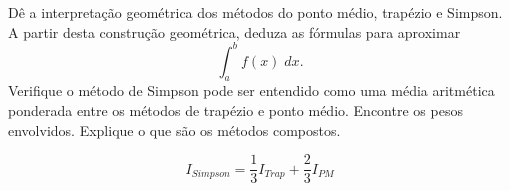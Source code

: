 %

\begin{exer}
 Dê a interpretação geométrica dos métodos do ponto médio, trapézio e Simpson. A partir desta construção geométrica, deduza as fórmulas para aproximar
 $$\int_a^bf(x)\;dx.$$
 Verifique o método de Simpson pode ser entendido como uma média aritmética ponderada entre os métodos de trapézio e ponto médio. Encontre os pesos envolvidos. Explique o que são os métodos compostos.
 \end{exer}
\begin{resp}

$$ I_{Simpson}= \frac{1}{3} I_{Trap}+ \frac{2}{3}I_{PM}$$

\end{resp}


